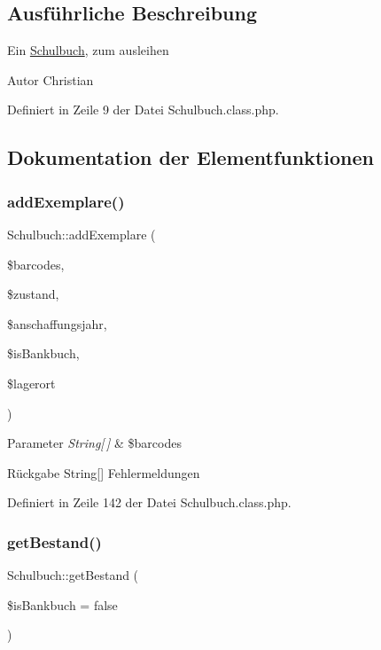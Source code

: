 \subsection{Ausführliche Beschreibung}
Ein \mbox{\hyperlink{class_schulbuch}{Schulbuch}}, zum ausleihen \begin{DoxyAuthor}{Autor}
Christian 
\end{DoxyAuthor}


Definiert in Zeile 9 der Datei Schulbuch.\+class.\+php.



\subsection{Dokumentation der Elementfunktionen}
\mbox{\label{class_schulbuch_a49330d9548394938847b4e49bf89d7ed}} 
\subsubsection{\texorpdfstring{add\+Exemplare()}{addExemplare()}}
{\footnotesize\ttfamily Schulbuch\+::add\+Exemplare (\begin{DoxyParamCaption}\item[{}]{\$barcodes,  }\item[{}]{\$zustand,  }\item[{}]{\$anschaffungsjahr,  }\item[{}]{\$is\+Bankbuch,  }\item[{}]{\$lagerort }\end{DoxyParamCaption})}


\begin{DoxyParams}{Parameter}
{\em String\mbox{[}$\,$\mbox{]}} & \$barcodes \\
\hline
\end{DoxyParams}
\begin{DoxyReturn}{Rückgabe}
String\mbox{[}\mbox{]} Fehlermeldungen 
\end{DoxyReturn}


Definiert in Zeile 142 der Datei Schulbuch.\+class.\+php.

\mbox{\label{class_schulbuch_a95a4cc2c16ada216be506ef40f598029}} 
\subsubsection{\texorpdfstring{get\+Bestand()}{getBestand()}}
{\footnotesize\ttfamily Schulbuch\+::get\+Bestand (\begin{DoxyParamCaption}\item[{}]{\$is\+Bankbuch = {\ttfamily false} }\end{DoxyParamCaption})}


